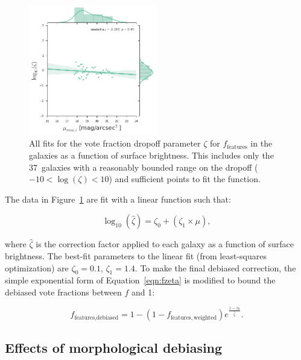 \documentclass[twocolumn]{aastex6}
\begin{document}
\begin{figure}
\center
\includegraphics[width=0.50\textwidth]{figures/zeta_mu.png}
\caption{All fits for the vote fraction dropoff parameter $\zeta$ for $f_\textrm{features}$ in the \ferengi{} galaxies as a function of surface brightness. This includes only the 37~galaxies with a reasonably bounded range on the dropoff ($-10<\log(\zeta)<10$) and sufficient points to fit the function.}
\label{fig:zeta_mu}
\end{figure}

The data in Figure~\ref{fig:zeta_mu} are fit with a linear function such that:

\begin{equation}
\log_{10}(\hat\zeta) = \zeta_0 + (\zeta_1 \times \mu),
\label{eqn:zetafit}
\end{equation}

\noindent where $\hat\zeta$ is the correction factor applied to each galaxy as a function of surface brightness. The best-fit parameters to the linear fit (from least-squares optimization) are $\zeta_0=0.1$, $\zeta_1=1.4$. To make the final debiased correction, the simple exponential form of Equation~\ref{eqn:fzeta} is modified to bound the debiased vote fractions between $f$ and 1:

\begin{equation}
f_\textrm{features,debiased} = 1 - (1 - f_\mathrm{features,weighted})e^{\frac{z-z_0}{\hat\zeta}}.
\label{eqn:fzeta_mod}
\end{equation}

\subsection{Effects of morphological debiasing}\label{ssec:zeta_results}
\end{document}
